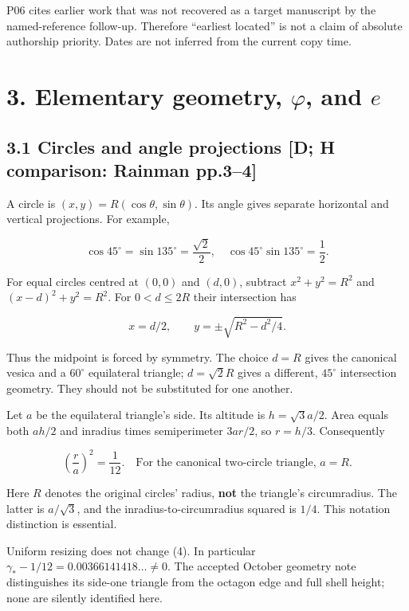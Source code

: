 \documentclass[11pt,a4paper]{article}
\begin{document}
P06 cites earlier work that was not recovered as a target manuscript by the named-reference follow-up. Therefore ``earliest located'' is not a claim of absolute authorship priority. Dates are not inferred from the current copy time.


\clearpage
\section*{3. Elementary geometry, $\varphi$, and $e$}

\subsection*{3.1 Circles and angle projections [D; H comparison: Rainman pp.3--4]}

A circle is $(x,y)=R(\cos\theta,\sin\theta)$. Its angle gives separate horizontal and vertical projections. For example,


\[
\cos45^\circ=\sin135^\circ=\frac{\sqrt2}{2},
\quad \cos45^\circ\sin135^\circ=\frac12. \tag{2}
\]

For equal circles centred at $(0,0)$ and $(d,0)$, subtract
$x^2+y^2=R^2$ and $(x-d)^2+y^2=R^2$. For $0<d\leq2R$ their intersection has


\[
x=d/2,\qquad y=\pm\sqrt{R^2-d^2/4}. \tag{3}
\]

Thus the midpoint is forced by symmetry. The choice $d=R$ gives the canonical vesica and a $60^\circ$ equilateral triangle; $d=\sqrt2R$ gives a different, $45^\circ$ intersection geometry. They should not be substituted for one another.


Let $a$ be the equilateral triangle's side. Its altitude is $h=\sqrt3a/2$. Area equals both $ah/2$ and inradius times semiperimeter $3ar/2$, so $r=h/3$. Consequently


\[
\left(\frac r a\right)^2=\frac1{12}.
\quad\text{For the canonical two-circle triangle, }a=R. \tag{4}
\]

Here $R$ denotes the original circles' radius, \textbf{not} the triangle's circumradius. The latter is $a/\sqrt3$, and the inradius-to-circumradius squared is $1/4$. This notation distinction is essential.


Uniform resizing does not change (4). In particular $\gamma_*-1/12=0.00366141418\ldots\ne0$. The accepted October geometry note distinguishes its side-one triangle from the octagon edge and full shell height; none are silently identified here.
\end{document}
